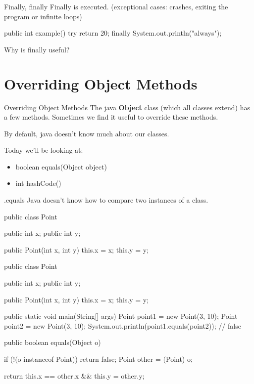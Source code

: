 \documentclass[week4]{csse2002}
\begin{document}
\begin{topic}{Finally, finally}
Finally is  executed. (exceptional cases: crashes, exiting the program or infinite loops)

\begin{java}
public int example() {
	try {
	    return 20;
    } finally {
        System.out.println("always");
    }
}
\end{java}

Why is finally useful?
\end{topic}

\section{Overriding Object Methods}
\begin{topic}{Overriding Object Methods}
The java \textbf{Object} class (which all classes extend) has a few
methods. Sometimes we find it useful to override these methods.

By default, java doesn't know much about our classes.

Today we'll be looking at:
\begin{itemize}
	\item boolean equals(Object object)
	\item int hashCode()
\end{itemize}
\end{topic}

\begin{topic}{.equals}
Java doesn't know how to compare two instances of a class.

\begin{subtopic}{1}
\begin{java}
public class Point {
	public int x;
	public int y;

	public Point(int x, int y) {
		this.x = x;
		this.y = y;
	}
}
\end{java}
\end{subtopic}

\begin{subtopic}{2}
\begin{java}
public class Point {
	public int x;
	public int y;

	public Point(int x, int y) {
		this.x = x;
		this.y = y;
	}

	public static void main(String[] args) {
		Point point1 = new Point(3, 10);
		Point point2 = new Point(3, 10);
		System.out.println(point1.equals(point2)); // false
	}
}
\end{java}
\end{subtopic}

\begin{subtopic}{3}
\begin{java}
public boolean equals(Object o) {
	if (!(o instanceof Point)) {
		return false;
	}
	Point other = (Point) o;

	return this.x == other.x && this.y = other.y;
}
\end{java}
\end{subtopic}
\end{topic}
\end{document}
